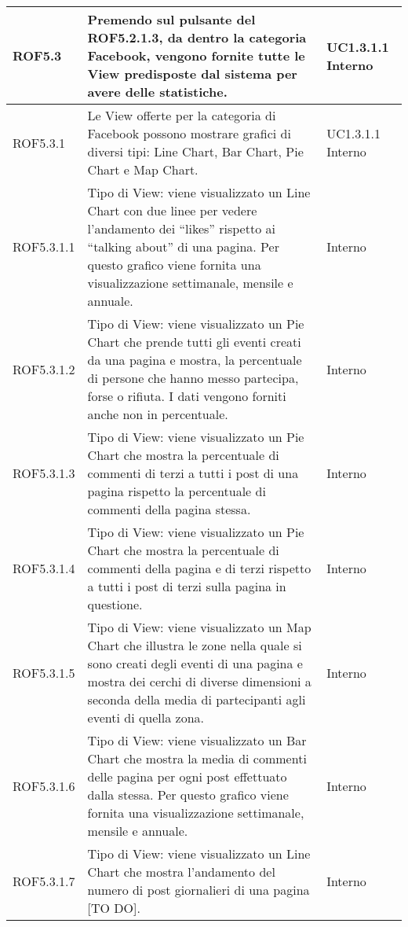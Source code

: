 \begin{center}
\begin{longtable}{| p{2.5cm} | p{8cm} | p{2cm} |}
		ROF5.3  & Premendo sul pulsante del ROF5.2.1.3, da dentro la categoria Facebook, vengono fornite tutte le View predisposte dal sistema per avere delle statistiche. & UC1.3.1.1 \newline Interno \\
		\hline
		ROF5.3.1  & Le View offerte per la categoria di Facebook possono mostrare grafici di diversi tipi: Line Chart, Bar Chart, Pie Chart e Map Chart. &  UC1.3.1.1 \newline Interno \\
		\hline
		ROF5.3.1.1  & Tipo di View: viene visualizzato un Line Chart con due linee per vedere l'andamento dei ``likes'' rispetto ai ``talking about'' di una pagina. Per questo grafico viene fornita una visualizzazione settimanale, mensile e annuale.  & Interno \\
		\hline
		ROF5.3.1.2  &  Tipo di View: viene visualizzato un Pie Chart che prende tutti gli eventi creati da una pagina e mostra, la percentuale di persone che hanno messo partecipa, forse o rifiuta. I dati vengono forniti anche non in percentuale. & Interno \\
		\hline
		ROF5.3.1.3  &  Tipo di View: viene visualizzato un Pie Chart che mostra la percentuale di commenti di terzi a tutti i post di una pagina rispetto la percentuale di commenti della pagina stessa. & Interno \\
		\hline
		ROF5.3.1.4  &  Tipo di View: viene visualizzato un Pie Chart che mostra la percentuale di commenti della pagina e di terzi rispetto a tutti i post di terzi sulla pagina in questione. & Interno \\
		\hline
		ROF5.3.1.5  &  Tipo di View: viene visualizzato un Map Chart che illustra le zone nella quale si sono creati degli eventi di una pagina e mostra dei cerchi di diverse dimensioni a seconda della media di partecipanti agli eventi di quella zona. & Interno \\
		\hline
		ROF5.3.1.6  &  Tipo di View: viene visualizzato un Bar Chart che mostra la media di commenti delle pagina per ogni post effettuato dalla stessa. Per questo grafico viene fornita una visualizzazione settimanale, mensile e annuale. & Interno \\
		\hline
		ROF5.3.1.7  &  Tipo di View: viene visualizzato un Line Chart che mostra l’andamento del numero di post giornalieri di una pagina [TO DO]. & Interno \\
		\hline



\end{longtable}
\end{center}
